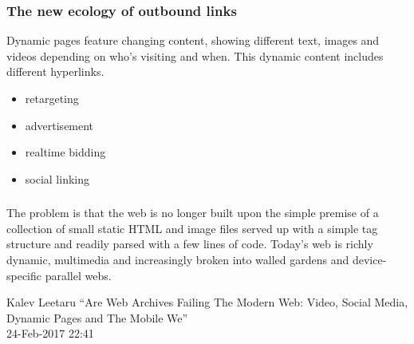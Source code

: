 \documentclass[aspectratio=169]{beamer}
\newcommand\blfootnote[1]{%
  \begingroup
  \renewcommand\thefootnote{}\footnote{#1}%
  \addtocounter{footnote}{-1}%
  \endgroup
}
\begin{document}
\begin{frame}
\frametitle{The new ecology of outbound links}
Dynamic pages feature changing content, showing different text, images and videos depending on who's visiting and when. This dynamic content includes different hyperlinks.\\\vspace{0.5cm}
\begin{itemize}
\item{retargeting}
\item{advertisement}
\item{realtime bidding}
\item{social linking}
\end{itemize}
\end{frame}


\begin{frame}
\frametitle{}

\epigraph{The problem is that the web is no longer built upon the simple premise of a collection of small static HTML and image files served up with a simple tag structure and readily parsed with a few lines of code. Today’s web is richly dynamic, multimedia and increasingly broken into walled gardens and device-specific parallel webs.}{Kalev Leetaru ``Are Web Archives Failing The Modern Web: Video, Social Media, Dynamic Pages and The Mobile We''\\ 24-Feb-2017 22:41}
\end{frame}

\end{document}

